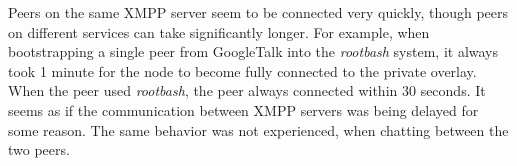 Peers on the same XMPP server seem to be connected very quickly, though peers
on different services can take significantly longer.  For example, when
bootstrapping a single peer from GoogleTalk into the \textit{rootbash} system,
it always took 1 minute for the node to become fully connected to the private
overlay.  When the peer used \textit{rootbash}, the peer always connected
within 30 seconds.  It seems as if the communication between XMPP servers was
being delayed for some reason.  The same behavior was not experienced, when
chatting between the two peers.

\begin{center}
\end{center}
